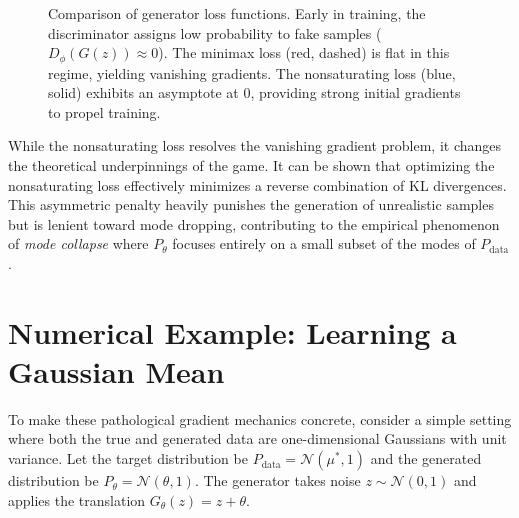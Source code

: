 \begin{figure}[htpb]
\centering
{}
\caption{Comparison of generator loss functions. Early in training, the discriminator assigns low probability to fake samples ($D_\phi(G(z)) \approx 0$). The minimax loss (red, dashed) is flat in this regime, yielding vanishing gradients. The nonsaturating loss (blue, solid) exhibits an asymptote at $0$, providing strong initial gradients to propel training.}
\label{fig:gan_loss}
\end{figure}

While the nonsaturating loss resolves the vanishing gradient problem, it changes the theoretical underpinnings of the game. It can be shown that optimizing the nonsaturating loss effectively minimizes a reverse combination of KL divergences. This asymmetric penalty heavily punishes the generation of unrealistic samples but is lenient toward mode dropping, contributing to the empirical phenomenon of \textit{mode collapse} where $P_\theta$ focuses entirely on a small subset of the modes of $P_{\text{data}}$.

\section{Numerical Example: Learning a Gaussian Mean}

To make these pathological gradient mechanics concrete, consider a simple setting where both the true and generated data are one-dimensional Gaussians with unit variance. Let the target distribution be $P_{\text{data}} = \mathcal{N}(\mu^*, 1)$ and the generated distribution be $P_\theta = \mathcal{N}(\theta, 1)$. The generator takes noise $z \sim \mathcal{N}(0, 1)$ and applies the translation $G_\theta(z) = z + \theta$. 

